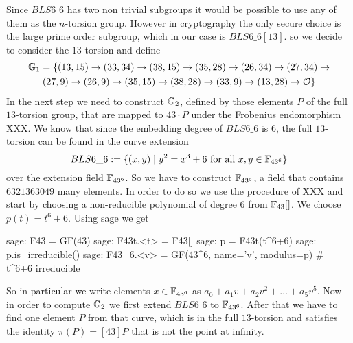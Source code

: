 Since $BLS6\_6$ has two non trivial subgroups it would be possible to use any of them as the $n$-torsion group. However in cryptography the only secure choice is the large prime order subgroup, which in our case is $BLS6\_6[13]$. so we decide to consider the $13$-torsion and define 
\begin{multline*}
\mathbb{G}_1=\{(13,15) \rightarrow (33,34) \rightarrow  (38,15) \rightarrow  (35,28) \rightarrow (26,34) \rightarrow  (27,34) \rightarrow  \\ 
(27,9)  \rightarrow  (26,9) \rightarrow  (35,15) \rightarrow  (38,28) \rightarrow  (33,9) \rightarrow (13,28) \rightarrow  \mathcal{O}\}$$
\end{multline*}
In the next step we need to construct $\mathbb{G}_2$,  defined by those elements $P$ of the full $13$-torsion group, that are mapped to $43\cdot P$ under the Frobenius endomorphism XXX. We know that since the embedding degree of $BLS6\_6$ is $6$, the full $13$-torsion can be found in the curve extension 
\begin{equation}
BLS6\_6 := \{(x,y)\;|\; y^2 = x^3 + 6 \text{ for all } x,y \in \mathbb{F}_{43^6}\}
\end{equation}
over the extension field $\mathbb{F}_{43^6}$. So we have to construct $\mathbb{F}_{43^6}$, a field that contains $6321363049$ many elements. In order to do so we use the procedure of XXX and start by choosing a non-reducible polynomial of degree $6$ from $\mathbb{F}_{43}[]$. We choose $p(t) = t^6+6$. Using sage we get
\begin{sagecommandline}
sage: F43 = GF(43)
sage: F43t.<t> = F43[]
sage: p = F43t(t^6+6)
sage: p.is_irreducible()
sage: F43_6.<v> = GF(43^6, name='v', modulus=p) # t^6+6 irreducible
\end{sagecommandline}
So in particular we write elements $x\in\mathbb{F}_{43^6}$ as $a_0+a_1v + a_2v^2+\ldots + a_5 v^5$. Now in order to compute $\mathbb{G}_2$ we first extend $BLS6\_6$ to $\mathbb{F}_{43^6}$. After that we have to find one element $P$ from that curve, which is in the full $13$-torsion and satisfies the identity $\pi(P) = [43]P$ that is not the point at infinity. 

